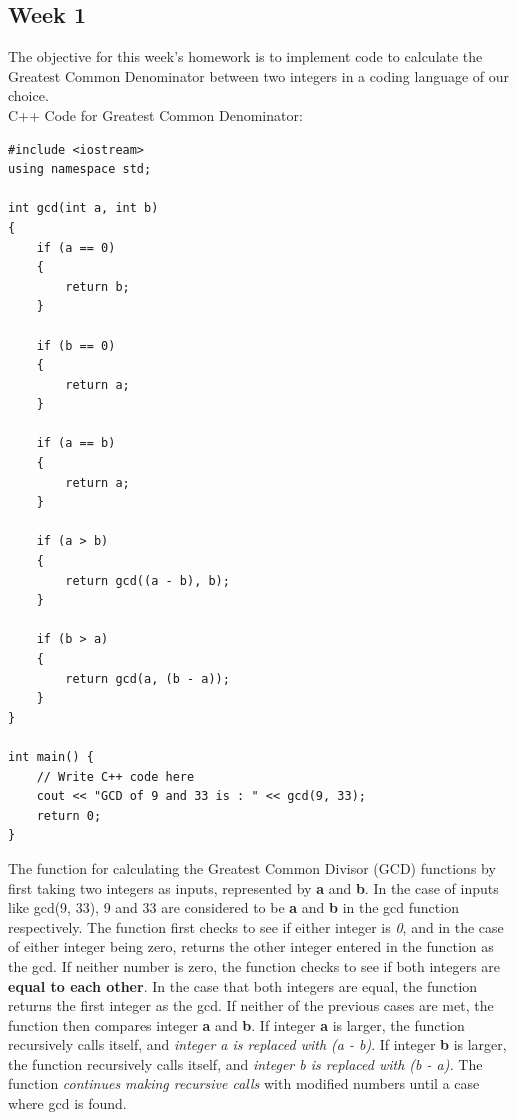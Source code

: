 \documentclass{article}
\theoremstyle{theorem}
\theoremstyle{definition}
\theoremstyle{remark}
\begin{document}
\subsection{Week 1}
The objective for this week's homework is to implement code to calculate the Greatest Common Denominator between two integers in a coding language of our choice.
\\
C++ Code for Greatest Common Denominator:
\begin{lstlisting}
#include <iostream>
using namespace std;

int gcd(int a, int b)
{
    if (a == 0)
    {
        return b;
    }

    if (b == 0)
    {
        return a;
    }

    if (a == b)
    {
        return a;
    }

    if (a > b)
    {
        return gcd((a - b), b);
    }

    if (b > a)
    {
        return gcd(a, (b - a));
    }
}

int main() {
    // Write C++ code here
    cout << "GCD of 9 and 33 is : " << gcd(9, 33);
    return 0;
}
\end{lstlisting}

    The function for calculating the Greatest Common Divisor (GCD) functions by first taking two integers as inputs, represented by \textbf{a} and \textbf{b}. In the case of inputs like gcd(9, 33), 9 and 33 are considered to be \textbf{a} and \textbf{b} in the gcd function respectively. The function first checks to see if either integer is \textit{0}, and in the case of either integer being zero, returns the other integer entered in the function as the gcd. If neither number is zero, the function checks to see if both integers are \textbf{equal to each other}. In the case that both integers are equal, the function returns the first integer as the gcd. If neither of the previous cases are met, the function then compares integer \textbf{a} and \textbf{b}. If integer \textbf{a} is larger, the function recursively calls itself, and \textit{integer a is replaced with (a - b)}. If integer \textbf{b} is larger, the function recursively calls itself, and \textit{integer b is replaced with (b - a).} The function \textit{continues making recursive calls} with modified numbers until a case where gcd is found.
\end{document}
